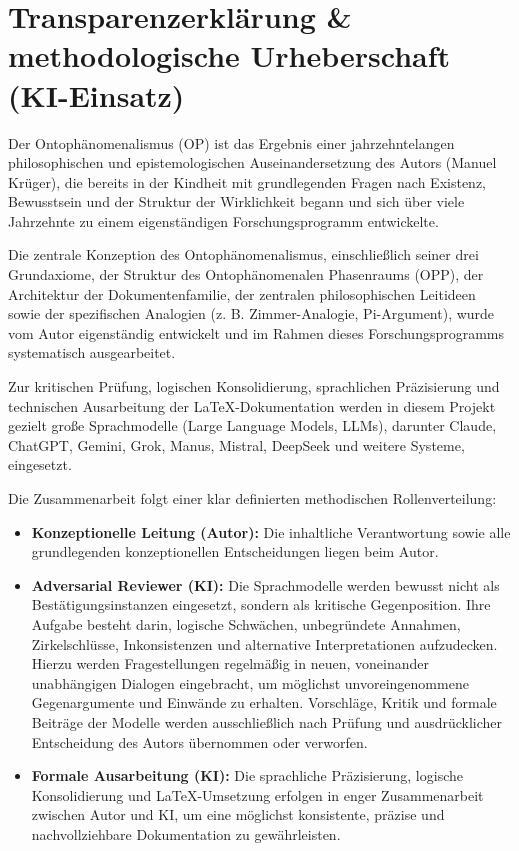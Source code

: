 \section*{Transparenzerklärung \& methodologische Urheberschaft (KI-Einsatz)}

Der Ontophänomenalismus (OP) ist das Ergebnis einer jahrzehntelangen philosophischen
und epistemologischen Auseinandersetzung des Autors (Manuel Krüger), die bereits in
der Kindheit mit grundlegenden Fragen nach Existenz, Bewusstsein und der Struktur der
Wirklichkeit begann und sich über viele Jahrzehnte zu einem eigenständigen
Forschungsprogramm entwickelte.
 
Die zentrale Konzeption des Ontophänomenalismus, einschließlich seiner drei Grundaxiome, der Struktur des Ontophänomenalen Phasenraums (OPP), der Architektur der Dokumentenfamilie, der zentralen philosophischen Leitideen sowie der spezifischen Analogien (z. B. Zimmer-Analogie, Pi-Argument), wurde vom Autor eigenständig entwickelt und im Rahmen dieses Forschungsprogramms systematisch ausgearbeitet.

Zur kritischen Prüfung, logischen Konsolidierung, sprachlichen Präzisierung und
technischen Ausarbeitung der LaTeX-Dokumentation werden in diesem Projekt gezielt
große Sprachmodelle (Large Language Models, LLMs), darunter Claude, ChatGPT, Gemini, Grok, Manus, Mistral, DeepSeek und
weitere Systeme, eingesetzt.

Die Zusammenarbeit folgt einer klar definierten methodischen Rollenverteilung:

\begin{itemize}
    \item \textbf{Konzeptionelle Leitung (Autor):} Die inhaltliche Verantwortung sowie
    alle grundlegenden konzeptionellen Entscheidungen liegen beim Autor.

    \item \textbf{Adversarial Reviewer (KI):} Die Sprachmodelle werden bewusst nicht als
    Bestätigungsinstanzen eingesetzt, sondern als kritische Gegenposition. Ihre Aufgabe
    besteht darin, logische Schwächen, unbegründete Annahmen, Zirkelschlüsse,
    Inkonsistenzen und alternative Interpretationen aufzudecken. Hierzu werden
    Fragestellungen regelmäßig in neuen, voneinander unabhängigen Dialogen eingebracht,
    um möglichst unvoreingenommene Gegenargumente und Einwände zu erhalten. Vorschläge,
    Kritik und formale Beiträge der Modelle werden ausschließlich nach Prüfung und
    ausdrücklicher Entscheidung des Autors übernommen oder verworfen.

    \item \textbf{Formale Ausarbeitung (KI):} Die sprachliche Präzisierung, logische
    Konsolidierung und LaTeX-Umsetzung erfolgen in enger Zusammenarbeit zwischen Autor
    und KI, um eine möglichst konsistente, präzise und nachvollziehbare Dokumentation
    zu gewährleisten.
\end{itemize}

